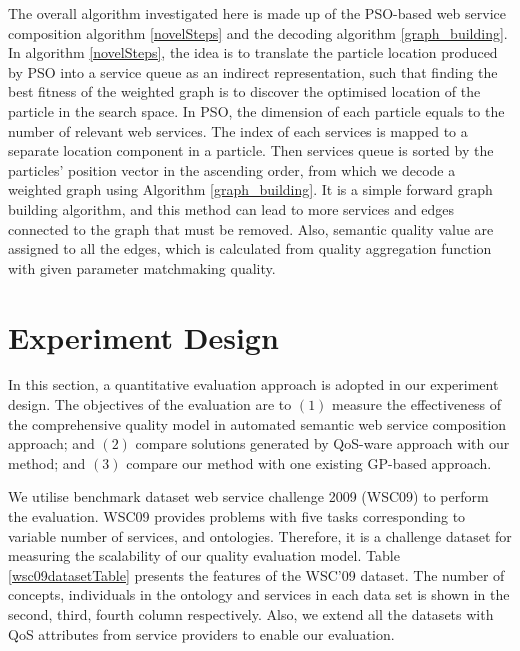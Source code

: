 \documentclass{IEEEtran}
\begin{document}
The overall algorithm investigated here is made up of the PSO-based web service composition algorithm \ref{novelSteps} and the decoding algorithm \ref{graph_building}. In algorithm \ref{novelSteps}, the idea is to translate the particle location produced by PSO into a service queue as an indirect representation, such that finding the best fitness of the weighted graph is to discover the optimised location of the particle in the search space. In PSO, the dimension of each particle equals to the number of relevant web services. The index of each services is mapped to a separate location component in a particle. Then services queue is sorted by the particles' position vector in the ascending order, from which we decode a weighted graph using Algorithm \ref{graph_building}. It is a simple forward graph building algorithm, and this method can lead to more services and edges connected to the graph that must be removed. Also, semantic quality value are assigned to all the edges, which is calculated from quality aggregation function with given parameter matchmaking quality.


\section{Experiment Design}\label{experiment_design}
In this section, a quantitative evaluation approach is adopted in our experiment design. The objectives of the evaluation are to $(1)$ measure the effectiveness of the comprehensive quality model in automated semantic web service composition approach; and $(2)$ compare solutions generated by QoS-ware approach with our method; and $(3)$ compare our method with one existing GP-based approach.


We utilise benchmark dataset web service challenge 2009 (WSC09) \cite{kona2009wsc} to perform the evaluation. WSC09 provides problems with five tasks corresponding to variable number of services, and ontologies. Therefore, it is a challenge dataset for measuring the scalability of our quality evaluation model. Table \ref{wsc09datasetTable} presents the features of the WSC’09 dataset. The number of concepts, individuals in the ontology and services in each data set is shown in the second, third, fourth column respectively. Also, we extend all the datasets with QoS attributes from service providers to enable our evaluation. 
\end{document}
